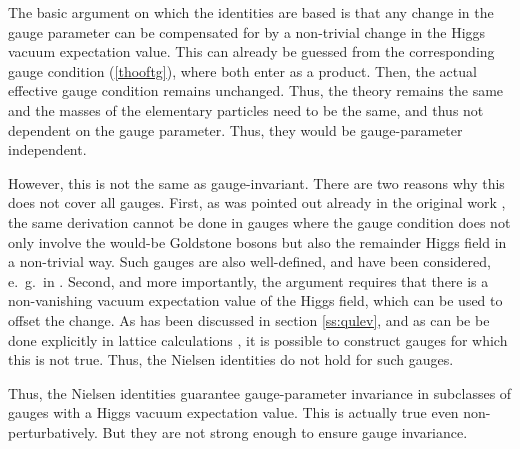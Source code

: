 \documentclass[final,12pt,3p,longtitle]{elsarticle}
\newcommand*{\pref}[1]{(\ref{#1})}
\newcommand*{\1}{1\!\!\!\bot}
\begin{document}
The basic argument on which the identities are based is that any change in the gauge parameter can be compensated for by a non-trivial change in the Higgs vacuum expectation value. This can already be guessed from the corresponding gauge condition \pref{thooftg}, where both enter as a product. Then, the actual effective gauge condition remains unchanged. Thus, the theory remains the same and the masses of the elementary particles need to be the same, and thus not dependent on the gauge parameter. Thus, they would be gauge-parameter independent. 

However, this is not the same as gauge-invariant. There are two reasons why this does not cover all gauges. First, as was pointed out already in the original work \cite{Nielsen:1975fs}, the same derivation cannot be done in gauges where the gauge condition does not only involve the would-be Goldstone bosons but also the remainder Higgs field in a non-trivial way. Such gauges are also well-defined, and have been considered, e.\ g.\ in \cite{Dolan:1974gu}. Second, and more importantly, the argument requires that there is a non-vanishing vacuum expectation value of the Higgs field, which can be used to offset the change. As has been discussed in section \ref{ss:qulev}, and as can be be done explicitly in lattice calculations \cite{Maas:2012ct}, it is possible to construct gauges for which this is not true. Thus, the Nielsen identities do not hold for such gauges.

Thus, the Nielsen identities guarantee gauge-parameter invariance in subclasses of gauges with a Higgs vacuum expectation value. This is actually true even non-perturbatively. But they are not strong enough to ensure gauge invariance.
\end{document}
